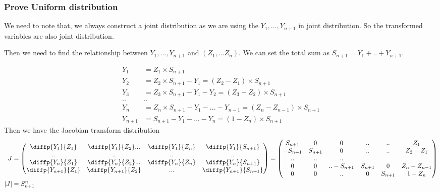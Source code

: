 \documentclass[11pt]{article} %
\begin{document}
\subsubsection{Prove Uniform distribution}



We need to note that, we always construct a joint distribution as we are using the $Y_1, ..., Y_{n+1}$ in joint distribution. So the transformed variables are also joint distribution.

Then we need to find the relationship between $Y_1, ..., Y_{n+1}$ and $(Z_1, ... Z_n)$. We can set the total sum as $S_{n+1} = Y_1+ .. + Y_{n+1}$.

\begin{align*}
	Y_1 &= Z_1 \times S_{n+1} \\
	Y_2 &= Z_2 \times S_{n+1} - Y_1 = (Z_2  - Z_1) \times S_{n+1}\\
	Y_3 &= Z_3 \times S_{n+1} - Y_1 - Y_2 = (Z_3  - Z_2) \times S_{n+1}\\
	.. & ..\\
	Y_n &= Z_n \times S_{n+1} - Y_1 - ...- Y_{n-1} = (Z_n  - Z_{n-1}) \times S_{n+1}\\
	Y_{n+1} &= S_{n+1} - Y_1 - ...- Y_{n} = (1- Z_n)  \times S_{n+1}
\end{align*}
Then we have the Jacobian transform distribution
\begin{align*}
	J &= \begin{pmatrix}
		\diffp{Y_1}{{Z_1}} & \diffp{Y_1}{{Z_2}} ... & \diffp{Y_1}{{Z_n}} & \diffp{Y_1}{{S_{n+1}}}\\
		..& ..& ..& ..\\
		\diffp{Y_n}{{Z_1}} & \diffp{Y_n}{{Z_2}}  ... & \diffp{Y_n}{{Z_n}} & \diffp{Y_n}{{S_{n+1}}}\\
		\diffp{Y_{n+1}}{{Z_1}} & \diffp{Y_{n+1}}{{Z_2}} & ...& \diffp{Y_{n+1}}{{S_{n+1}}}
	\end{pmatrix} =  \begin{pmatrix}
		S_{n+1} & 0 & 0 &.. & ..& Z_1  \\
		-S_{n+1} & S_{n+1} & 0 &.. &..& Z_2- Z_1  \\
		.. & .. & .. \\
		0 & 0&.. -S_{n+1} & S_{n+1}  &0 & Z_{n}- Z_{n-1}  \\
		0 & 0 &..& 0 & S_{n+1}& 1- Z_n\\
	\end{pmatrix}\\
	|J| &= S_{n+1}^{n}
\end{align*}
\end{document}
